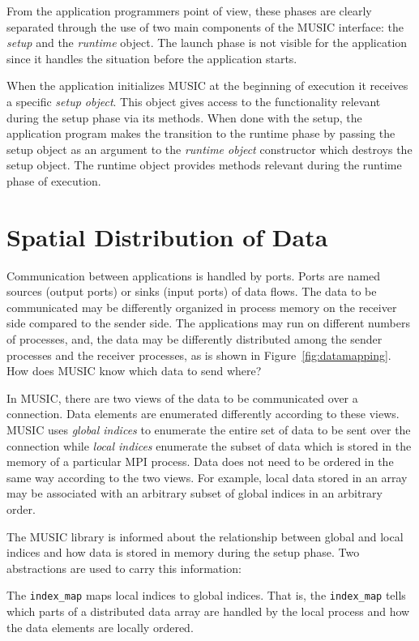 \documentclass[a4paper]{report}
\begin{document}
From the application programmers point of view, these phases are
clearly separated through the use of two main components of the
MUSIC interface: the \emph{setup} and the \emph{runtime} object.  The
launch phase is not visible for the application since it handles the
situation before the application starts.

When the application initializes MUSIC at the beginning of execution
it receives a specific \emph{setup object}.  This object gives access
to the functionality relevant during the setup phase via its methods.
When done with the setup, the application program makes the transition
to the runtime phase by passing the setup object as an argument to the
\emph{runtime object} constructor which destroys the setup object.
The runtime object provides methods relevant during the runtime phase
of execution.

\section{Spatial Distribution of Data}
\label{sec:spatialdist}

Communication between applications is handled by ports.  Ports are
named sources (output ports) or sinks (input ports) of data flows.
The data to be communicated may be differently organized in process
memory on the receiver side compared to the sender side.  The
applications may run on different numbers of processes, and, the data
may be differently distributed among the sender processes and the
receiver processes, as is shown in Figure~\ref{fig:datamapping}.  How
does MUSIC know which data to send where?

In MUSIC, there are two views of the data to be communicated over a
connection.  Data elements are enumerated differently according to
these views.  MUSIC uses \emph{global indices} to
enumerate the entire set of data to be sent over the connection while
\emph{local indices} enumerate the subset of data
which is stored in the memory of a particular MPI process.  Data does
not need to be ordered in the same way according to the two views.
For example, local data stored in an array may be associated with an
arbitrary subset of global indices in an arbitrary order.

The MUSIC library is informed about the relationship between global
and local indices and how data is stored in memory during the setup
phase.  Two abstractions are used to carry this information:

The \lstinline|index_map| maps local indices to global indices.  That
is, the \lstinline|index_map| tells which parts of a distributed data
array are handled by the local process and how the data elements are
locally ordered.
\end{document}
